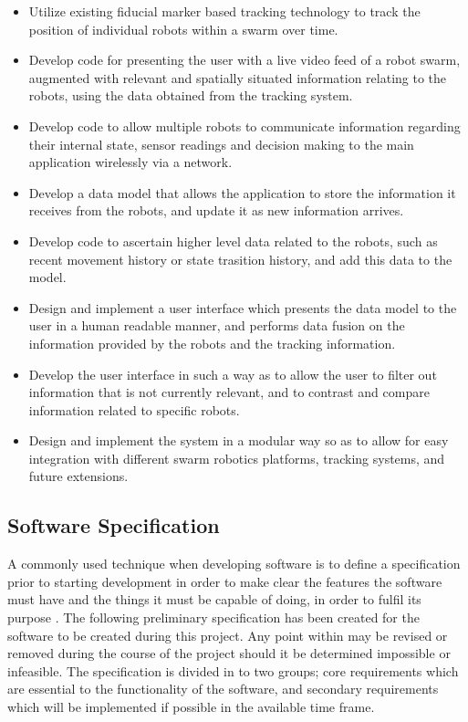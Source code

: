 \documentclass[titlepage,hidelinks,10pt]{article}
\begin{document}
\begin{itemize}
	\item Utilize existing fiducial marker based tracking technology to track the position of individual robots within a swarm over time.
	\item Develop code for presenting the user with a live video feed of a robot swarm, augmented with relevant and spatially situated information relating to the robots, using the data obtained from the tracking system.
	\item Develop code to allow multiple robots to communicate information regarding their internal state, sensor readings and decision making to the main application wirelessly via a network.
	\item Develop a data model that allows the application to store the information it receives from the robots, and update it as new information arrives.
	\item Develop code to ascertain higher level data related to the robots, such as recent movement history or state trasition history, and add this data to the model.
	\item Design and implement a user interface which presents the data model to the user in a human readable manner, and performs data fusion on the information provided by the robots and the tracking information.
	\item Develop the user interface in such a way as to allow the user to filter out information that is not currently relevant, and to contrast and compare information related to specific robots.
	\item Design and implement the system in a modular way so as to allow for easy integration with different swarm robotics platforms, tracking systems, and future extensions.
\end{itemize}

\subsection{Software Specification}
A commonly used technique when developing software is to define a specification prior to starting development in order to make clear the features the software must have and the things it must be capable of doing, in order to fulfil its purpose \cite{NASAApproach}. The following preliminary specification has been created for the software to be created during this project. Any point within may be revised or removed during the course of the project should it be determined impossible or infeasible. The specification is divided in to two groups; core requirements which are essential to the functionality of the software, and secondary requirements which will be implemented if possible in the available time frame.
\end{document}
